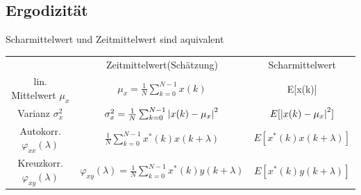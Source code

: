 \documentclass[10pt,a4paper]{article}
\begin{document}
\subsection{Ergodizität}
Scharmittelwert und Zeitmittelwert sind aquivalent\\
\scriptsize
\begin{center}
\begin{tabular}{|c|c|c|}
\cline{1-3}
        & Zeitmittelwert(Schätzung) & Scharmittelwert \\
\cline{1-3}
        lin. Mittelwert $\mu_x$ & $\mu_x = \frac{1}{N}\sum_{k=0}^{N-1}x(k)$ & E[x(k)] \\
\cline{1-3}
        Varianz $\sigma_x^2$ & $\sigma_x^2 = \frac{1}{N}\sum_{k=0}^{N-1}\abs{x(k)-\mu_x}^2$ & $E[\abs{x(k)-\mu_x}^2]$ \\
\cline{1-3}
        Autokorr. $\varphi_{xx}(\lambda)$ & $\frac{1}{N}\sum_{k=0}^{N-1} x^*(k)x(k+\lambda) $ & $E[x^*(k)x(k+\lambda)]$ \\
\cline{1-3}
        Kreuzkorr. $\varphi_{xy}(\lambda)$ & $\varphi_{xy}(\lambda)=\frac{1}{N}\sum_{k=0}^{N-1} x^*(k)y(k+\lambda) $ & $E[x^*(k)y(k+\lambda)]$ \\
\cline{1-3}
\end{tabular}
\end{center}
\normalsize
\end{document}

